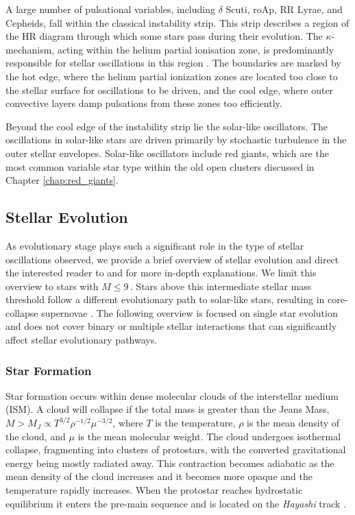 A large number of pulsational variables, including $\delta$ Scuti, roAp, RR Lyrae, and Cepheids, fall within the classical instability strip. This strip describes a region of the HR diagram through which some stars pass during their evolution. The $\kappa$-mechanism, acting within the helium partial ionisation zone, is predominantly responsible for stellar oscillations in this region \citep{king_pulsating_1968}. The boundaries are marked by the hot edge, where the helium partial ionization zones are located too close to the stellar surface for oscillations to be driven, and the cool edge, where outer convective layers damp pulsations from these zones too efficiently.

Beyond the cool edge of the instability strip lie the solar-like oscillators. The oscillations in solar-like stars are driven primarily by stochastic turbulence in the outer stellar envelopes. Solar-like oscillators include red giants, which are the most common variable star type within the old open clusters discussed in Chapter \ref{chap:red_giants}.

\subsection{Stellar Evolution}

As evolutionary stage plays such a significant role in the type of stellar oscillations observed, we provide a brief overview of stellar evolution and direct the interested reader to \cite{kippenhahn_stellar_2012} and \cite{christensen-dalsgaard_stellar_2002} for more in-depth explanations. We limit this overview to stars with $M \leq 9$\,\Msol. Stars above this intermediate stellar mass threshold follow a different evolutionary path to solar-like stars, resulting in core-collapse supernovae \citep{herwig_evolution_2013-1}. The following overview is focused on single star evolution and does not cover binary or multiple stellar interactions that can significantly affect stellar evolutionary pathways.

\subsubsection{Star Formation}

Star formation occurs within dense molecular clouds of the interstellar medium (ISM). A cloud will collapse if the total mass is greater than the Jeans Mass, $M > M_J \propto T^{3/2} \rho^{-1/2} \mu^{-3/2}$, where $T$ is the temperature, $\rho$ is the mean density of the cloud, and $\mu$ is the mean molecular weight. The cloud undergoes isothermal collapse, fragmenting into clusters of protostars, with the converted gravitational energy being mostly radiated away. This contraction becomes adiabatic as the mean density of the cloud increases and it becomes more opaque and the temperature rapidly increases. When the protostar reaches hydrostatic equilibrium it enters the pre-main sequence and is located on the {\em Hayashi} track \citep{hayashi_stellar_1961}.

